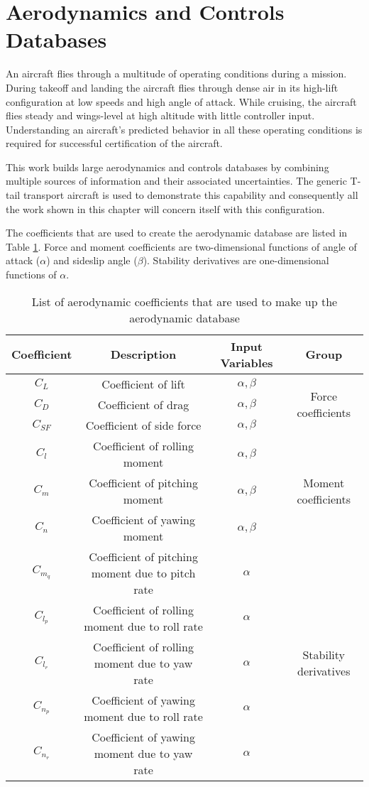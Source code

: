 \section{Aerodynamics and Controls Databases}

An aircraft flies through a multitude of operating conditions during a mission. During takeoff and landing the aircraft flies through dense air in its high-lift configuration at low speeds and high angle of attack. While cruising, the aircraft flies steady and wings-level at high altitude with little controller input. Understanding an aircraft's predicted behavior in all these operating conditions is required for successful certification of the aircraft. 

This work builds large aerodynamics and controls databases by combining multiple sources of information and their associated uncertainties. The generic T-tail transport aircraft is used to demonstrate this capability and consequently all the work shown in this chapter will concern itself with this configuration.

The coefficients that are used to create the aerodynamic database are listed in Table \ref{tab:aero_db}. Force and moment coefficients are two-dimensional functions of angle of attack ($\alpha$) and sideslip angle ($\beta$). Stability derivatives are one-dimensional functions of $\alpha$. 
\begin{table}
    \renewcommand{\arraystretch}{1.2}
    \centering
    \begin{tabular}{ c|c|c|c } 
         Coefficient & Description & Input Variables & Group \\ 
         \hline
         $C_L$ & Coefficient of lift & $\alpha, \beta$  & \multirow{3}{5em}{Force coefficients}\\ 
         $C_D$ & Coefficient of drag & $\alpha, \beta$  \\
         $C_{SF}$ & Coefficient of side force & $\alpha, \beta$  \\ \hline
         $C_l$ & Coefficient of rolling moment & $\alpha, \beta$  & \multirow{3}{5em}{Moment coefficients} \\
         $C_m$ & Coefficient of pitching moment & $\alpha, \beta$  \\
         $C_n$ & Coefficient of yawing moment & $\alpha, \beta$  \\ \hline
         $C_{m_q}$ & Coefficient of pitching moment due to pitch rate & $\alpha$  & \multirow{5}{5em}{Stability derivatives}\\
         $C_{l_p}$ & Coefficient of rolling moment due to roll rate & $\alpha$ \\
         $C_{l_r}$ & Coefficient of rolling moment due to yaw rate & $\alpha$ \\
         $C_{n_p}$ & Coefficient of yawing moment due to roll rate & $\alpha$ \\
         $C_{n_r}$ & Coefficient of yawing moment due to yaw rate & $\alpha$
         \\
    \end{tabular}
    \caption{List of aerodynamic coefficients that are used to make up the aerodynamic database}
    \label{tab:aero_db}
\end{table}

